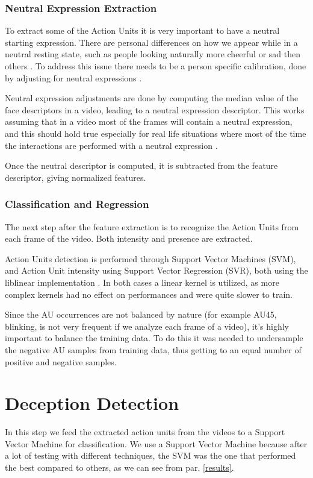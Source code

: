 \subsubsection{Neutral Expression Extraction}
To extract some of the Action Units it is very important to have a neutral starting expression. There are personal differences on how we appear while in a neutral resting state, such as people looking naturally more cheerful or sad then others \cite{normexpr}. To address this issue there needs to be a person specific calibration, done by adjusting for neutral expressions \cite{Baltru2013}.

Neutral expression adjustments are done by computing the median value of the face descriptors in a video, leading to a neutral expression descriptor. This works assuming that in a video most of the frames will contain a neutral expression, and this should hold true especially for real life situations where most of the time the interactions are performed with a neutral expression \cite{NatAffData}.

Once the neutral descriptor is computed, it is subtracted from the feature descriptor, giving normalized features. 

\subsubsection{Classification and Regression}
The next step after the feature extraction is to recognize the Action Units from each frame of the video. Both intensity and presence are extracted.

Action Units detection is performed through Support Vector Machines (SVM), and Action Unit intensity using Support Vector Regression (SVR), both using the liblinear implementation \cite{liblinear}. In both cases a linear kernel is utilized, as more complex kernels had no effect on performances and were quite slower to train.  

Since the AU occurrences are not balanced by nature (for example AU45, blinking, is not very frequent if we analyze each frame of a video), it's highly important to balance the training data. To do this it was needed to undersample the negative AU samples from training data, thus getting to an equal number of positive and negative samples.

\clearpage

\section{Deception Detection} \label{dec_det}
In this step we feed the extracted action units from the videos to a Support Vector Machine for classification.
We use a Support Vector Machine because after a lot of testing with different techniques, the SVM was the one that performed the best compared to others, as we can see from par. \ref{results}. 

